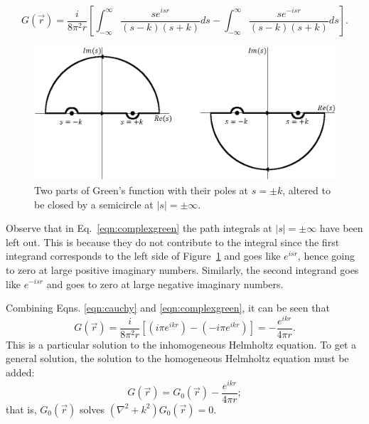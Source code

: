 %
\begin{equation}
\label{eqn:complexgreen}
G(\vec{r})=\frac{i}{8\pi^2r}\left[ \int_{-\infty}^\infty \frac{se^{isr}}{(s-k)(s+k)}ds-\int_{-\infty}^\infty \frac{se^{-isr}}{(s-k)(s+k)}ds \right].
\end{equation}
%
\begin{figure}
  \centering
    \includegraphics[width=\textwidth]{Figures/complexgreen} 
  \caption{Two parts of Green's function with their poles at $s=\pm k$, altered to be closed by a semicircle at $|s|=\pm\infty$.}
  \label{fig:complexgreen}
\end{figure}

Observe that in Eq.~\eqref{eqn:complexgreen} the path integrals at $|s|=\pm\infty$ have been left out. This is because they do not contribute to the integral since the first integrand corresponds to the left side of Figure~\ref{fig:complexgreen} and goes like $e^{isr}$, hence going to zero at large positive imaginary numbers. Similarly, the second integrand goes like $e^{-isr}$ and goes to zero at large negative imaginary numbers.

Combining Eqns. \ref{eqn:cauchy} and \ref{eqn:complexgreen}, it can be seen that
%
\begin{equation}
\nonumber
G(\vec{r})=\frac{i}{8\pi^2r}[(i\pi e^{ikr})-(-i\pi e^{ikr})]=-\frac{e^{ikr}}{4\pi r}.
\end{equation}
This is a particular solution to the inhomogeneous Helmholtz equation. To get a general solution, the solution to the homogeneous Helmholtz equation must be added:
%
\begin{equation}
\label{eqn:greensolution}
G(\vec{r})=G_0(\vec{r})-\frac{e^{ikr}}{4\pi r};
\end{equation}
that is, $G_0(\vec{r})$ solves $(\nabla^2+k^2)G_0(\vec{r})=0$.

